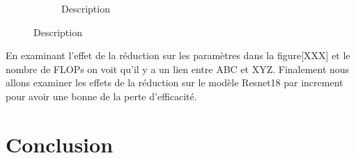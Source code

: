 \documentclass[12pt]{article}
\begin{document}
\begin{figure}[H]
\begin{subfigure}[b]{0.5\textwidth}
		\caption{Description}
		\label{fig:D-Imager}
	\end{subfigure}
\end{figure}


En examinant l’effet de la réduction sur les paramètres dans la figure[XXX] et le nombre de FLOPs on voit qu’il y a un lien entre ABC et XYZ. 
Finalement nous allons examiner les effets de la réduction sur le modèle Resnet18 par increment pour avoir une bonne de la perte d’efficacité. 

\section*{Conclusion}

\newpage



\end{document}

